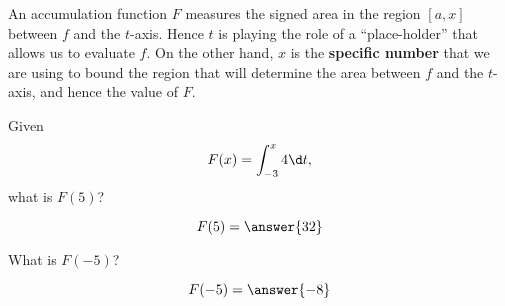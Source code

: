 \documentclass{ximera}
\begin{document}
An accumulation function $F$ measures the signed area in the region
$[a,x]$ between $f$ and the $t$-axis. Hence $t$ is playing the role of
a ``place-holder'' that allows us to evaluate $f$. On the other hand,
$x$ is the \textbf{specific number} that we are using to bound the
region that will determine the area between $f$ and the $t$-axis, and
hence the value of $F$.
\begin{question}
  Given
  \[
  F(x) = \int_{-3}^x 4 \d t,
  \]
  what is $F(5)$?
  \begin{prompt}
    \[
    F(5) = \answer{32}
    \]
  \end{prompt}
  \begin{question}
    What is $F(-5)$?
    \begin{prompt}
      \[
      F(-5) = \answer{-8}
      \]
    \end{prompt}
  \end{question}
\end{question}
\end{document}

